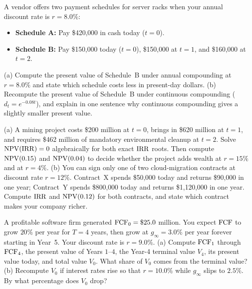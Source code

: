 \begin{exercise}
A vendor offers two payment schedules for server racks when your annual discount rate is $r = 8.0\%$:
\begin{itemize}
 \item \textbf{Schedule A:} Pay \$420,000 in cash today ($t = 0$).
 \item \textbf{Schedule B:} Pay \$150,000 today ($t = 0$), \$150,000 at $t = 1$, and \$160,000 at $t = 2$.
\end{itemize}
(a) Compute the present value of Schedule~B under annual compounding at $r = 8.0\%$ and state which schedule costs less in present-day dollars.
(b) Recompute the present value of Schedule~B under continuous compounding ($d_t = e^{-0.08t}$), and explain in one sentence why continuous compounding gives a slightly smaller present value.
\end{exercise}

\begin{exercise}
(a) A mining project costs \$200 million at $t = 0$, brings in \$620 million at $t = 1$, and requires \$462 million of mandatory environmental cleanup at $t = 2$. Solve $\operatorname{NPV}(\operatorname{IRR}) = 0$ algebraically for both exact $\operatorname{IRR}$ roots. Then compute $\operatorname{NPV}(0.15)$ and $\operatorname{NPV}(0.04)$ to decide whether the project adds wealth at $r = 15\%$ and at $r = 4\%$.
(b) You can sign only one of two cloud-migration contracts at discount rate $r = 12\%$. Contract~X spends \$50,000 today and returns \$90,000 in one year; Contract~Y spends \$800,000 today and returns \$1,120,000 in one year. Compute $\operatorname{IRR}$ and $\operatorname{NPV}(0.12)$ for both contracts, and state which contract makes your company richer.
\end{exercise}

\begin{exercise}
A profitable software firm generated $\operatorname{FCF}_0 = \$25.0$ million. You expect $\operatorname{FCF}$ to grow $20\%$ per year for $T = 4$ years, then grow at $g_\infty = 3.0\%$ per year forever starting in Year~5. Your discount rate is $r = 9.0\%$.
(a) Compute $\operatorname{FCF}_1$ through $\operatorname{FCF}_4$, the present value of Years $1$--$4$, the Year-4 terminal value $V_4$, its present value today, and total value $V_0$. What share of $V_0$ comes from the terminal value?
(b) Recompute $V_0$ if interest rates rise so that $r = 10.0\%$ while $g_\infty$ slips to $2.5\%$. By what percentage does $V_0$ drop?
\end{exercise}

